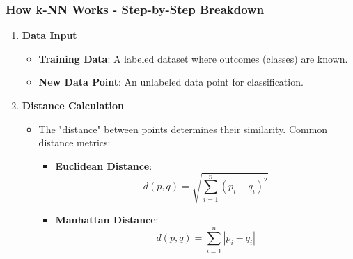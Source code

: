 \documentclass[aspectratio=169]{beamer}
\begin{document}
\begin{frame}[fragile]
    \frametitle{How k-NN Works - Step-by-Step Breakdown}
    \begin{enumerate}
        \item \textbf{Data Input}
            \begin{itemize}
                \item \textbf{Training Data}: A labeled dataset where outcomes (classes) are known.
                \item \textbf{New Data Point}: An unlabeled data point for classification.
            \end{itemize}

        \item \textbf{Distance Calculation}
            \begin{itemize}
                \item The "distance" between points determines their similarity. Common distance metrics:
                \begin{itemize}
                    \item \textbf{Euclidean Distance}:
                    \begin{equation*}
                    d(p, q) = \sqrt{\sum_{i=1}^{n}(p_i - q_i)^2}
                    \end{equation*}
                    \item \textbf{Manhattan Distance}:
                    \begin{equation*}
                    d(p, q) = \sum_{i=1}^{n}|p_i - q_i|
                    \end{equation*}
                \end{itemize}
            \end{itemize}
    \end{enumerate}
\end{frame}
\end{document}
